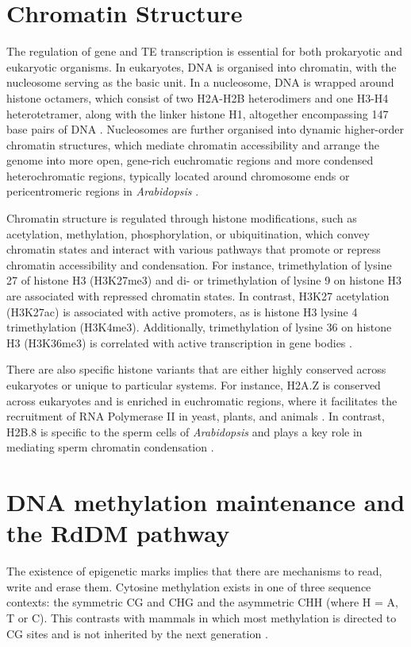 \section{Chromatin Structure}

The regulation of gene and TE transcription is essential for both prokaryotic and eukaryotic organisms. In eukaryotes, DNA is organised into chromatin, with the nucleosome serving as the basic unit. In a nucleosome, DNA is wrapped around histone octamers, which consist of two H2A-H2B heterodimers and one H3-H4 heterotetramer, along with the linker histone H1, altogether encompassing 147 base pairs of DNA \citep{RN294}. Nucleosomes are further organised into dynamic higher-order chromatin structures, which mediate chromatin accessibility and arrange the genome into more open, gene-rich euchromatic regions and more condensed heterochromatic regions, typically located around chromosome ends or pericentromeric regions in \textit{Arabidopsis} \citep{RN299}. 

Chromatin structure is regulated through histone modifications, such as acetylation, methylation, phosphorylation, or ubiquitination, which convey chromatin states and interact with various pathways that promote or repress chromatin accessibility and condensation.  For instance, trimethylation of lysine 27 of histone H3 (H3K27me3) and di- or trimethylation of lysine 9 on histone H3 are associated with repressed chromatin states. In contrast, H3K27 acetylation (H3K27ac) is associated with active promoters, as is histone H3 lysine 4 trimethylation (H3K4me3). Additionally, trimethylation of lysine 36 on histone H3 (H3K36me3) is correlated with active transcription in gene bodies \citep{RN297,RN298}. 

There are also specific histone variants that are either highly conserved across eukaryotes or unique to particular systems. For instance, H2A.Z is conserved across eukaryotes and is enriched in euchromatic regions, where it facilitates the recruitment of RNA Polymerase II in yeast, plants, and animals \citep{RN295,RN296}. In contrast, H2B.8 is specific to the sperm cells of \textit{Arabidopsis} and plays a key role in mediating sperm chromatin condensation \citep{RN285}.

\section{DNA methylation maintenance and the RdDM pathway} 

The existence of epigenetic marks implies that there are mechanisms to read, write and erase them. Cytosine methylation exists in one of three sequence contexts: the symmetric CG and CHG and the asymmetric CHH (where H = A, T or C).  This contrasts with mammals in  which most methylation is directed to CG sites  and is not inherited by the next generation \citep{RN228}. 

